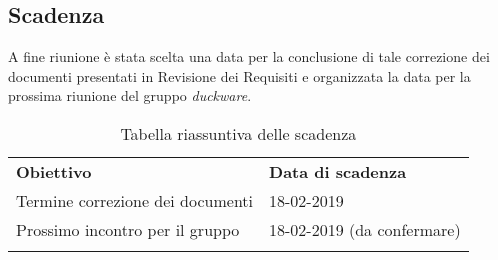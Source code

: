	\subsection{Scadenza}
	\label{sec:scadenza}
	A fine riunione è stata scelta una data per la conclusione di tale correzione dei documenti presentati in Revisione dei Requisiti e organizzata la data per la prossima riunione del gruppo \textit{duckware}.
	
	\begin{center}
		\renewcommand{\arraystretch}{1.5}
		\begin{longtable}{  p{6cm} p{5cm}  }
			\rowcolor{tableHeadYellow}
			\textbf{Obiettivo} & \textbf{Data di scadenza}\\
			Termine correzione dei documenti & 18-02-2019 \\
			Prossimo incontro per il gruppo & 18-02-2019 (da confermare) \\
			\rowcolor{white}
			\caption{Tabella riassuntiva delle scadenza}
			\label{sec:tabella_riassuntiva2}
		\end{longtable}
	\end{center}
